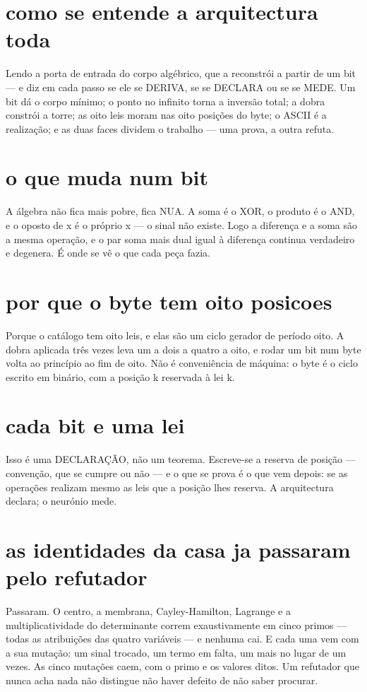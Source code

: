 \documentclass[11pt,a4paper]{article}
\begin{document}
\section{como se entende a arquitectura toda}
Lendo a porta de entrada do corpo algébrico, que a reconstrói a partir de um bit — e diz
em cada passo se ele se DERIVA, se se DECLARA ou se se MEDE. Um bit dá o corpo mínimo; o
ponto no infinito torna a inversão total; a dobra constrói a torre; as oito leis moram nas
oito posições do byte; o ASCII é a realização; e as duas faces dividem o trabalho — uma
prova, a outra refuta.

\section{o que muda num bit}
A álgebra não fica mais pobre, fica NUA. A soma é o XOR, o produto é o AND, e o oposto de x
é o próprio x — o sinal não existe. Logo a diferença e a soma são a mesma operação, e o par
soma mais dual igual à diferença continua verdadeiro e degenera. É onde se vê o que cada
peça fazia.

\section{por que o byte tem oito posicoes}
Porque o catálogo tem oito leis, e elas são um ciclo gerador de período oito. A dobra
aplicada três vezes leva um a dois a quatro a oito, e rodar um bit num byte volta ao
princípio ao fim de oito. Não é conveniência de máquina: o byte é o ciclo escrito em
binário, com a posição k reservada à lei k.

\section{cada bit e uma lei}
Isso é uma DECLARAÇÃO, não um teorema. Escreve-se a reserva de posição — convenção, que se
cumpre ou não — e o que se prova é o que vem depois: se as operações realizam mesmo as leis
que a posição lhes reserva. A arquitectura declara; o neurónio mede.

\section{as identidades da casa ja passaram pelo refutador}
Passaram. O centro, a membrana, Cayley-Hamilton, Lagrange e a multiplicatividade do
determinante correm exaustivamente em cinco primos — todas as atribuições das quatro
variáveis — e nenhuma cai. E cada uma vem com a sua mutação: um sinal trocado, um termo em
falta, um mais no lugar de um vezes. As cinco mutações caem, com o primo e os valores
ditos. Um refutador que nunca acha nada não distingue não haver defeito de não saber
procurar.
\end{document}
